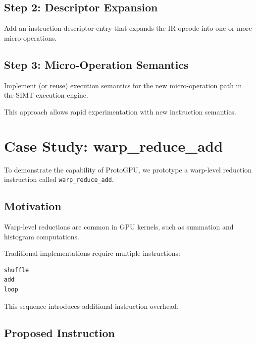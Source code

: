 \documentclass[11pt]{article}
\begin{document}
\hypertarget{step-2-define-descriptor-expansion}{%
\subsection{Step 2: Descriptor
Expansion}\label{step-2-define-descriptor-expansion}}

Add an instruction descriptor entry that expands the IR opcode into one
or more micro-operations.

\hypertarget{step-3-implementenable-micro-operation-semantics}{%
\subsection{Step 3: Micro-Operation
Semantics}\label{step-3-implementenable-micro-operation-semantics}}

Implement (or reuse) execution semantics for the new micro-operation
path in the SIMT execution engine.

This approach allows rapid experimentation with new instruction
semantics.


\hypertarget{case-study-warp_reduce_add}{%
\section{Case Study:
warp\_reduce\_add}\label{case-study-warp_reduce_add}}

To demonstrate the capability of ProtoGPU, we prototype a warp-level
reduction instruction called \texttt{warp\_reduce\_add}.

\hypertarget{motivation}{%
\subsection{Motivation}\label{motivation}}

Warp-level reductions are common in GPU kernels, such as summation and
histogram computations.

Traditional implementations require multiple instructions:

\begin{lstlisting}
shuffle
add
loop
\end{lstlisting}

This sequence introduces additional instruction overhead.


\hypertarget{proposed-instruction}{%
\subsection{Proposed Instruction}\label{proposed-instruction}}
\end{document}
